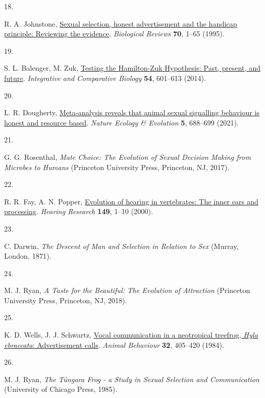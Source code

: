 \documentclass[
]{article}
\newlength{\cslhangindent}
\newlength{\csllabelwidth}
\newenvironment{CSLReferences}[2] %
 {\begin{list}{}{%
  \setlength{\itemindent}{0pt}
  \setlength{\leftmargin}{0pt}
  \setlength{\parsep}{0pt}
  \ifodd #1
   \setlength{\leftmargin}{\cslhangindent}
   \setlength{\itemindent}{-1\cslhangindent}
  \fi
  \setlength{\itemsep}{#2\baselineskip}}}
 {\end{list}}
\newcommand{\CSLLeftMargin}[1]{\parbox[t]{\csllabelwidth}{\strut#1\strut}}
\newcommand{\CSLRightInline}[1]{\parbox[t]{\linewidth - \csllabelwidth}{\strut#1\strut}}
\begin{document}
\begin{CSLReferences}{0}{0}
\CSLLeftMargin{18. }%
\CSLRightInline{R. A. Johnstone,
\href{https://doi.org/10.1111/j.1469-185X.1995.tb01439.x}{Sexual
selection, honest advertisement and the handicap principle: {Reviewing}
the evidence}. \emph{Biological Reviews} \textbf{70}, 1--65 (1995).}

\CSLLeftMargin{19. }%
\CSLRightInline{S. L. Balenger, M. Zuk,
\href{https://doi.org/10.1093/icb/icu059}{Testing the {Hamilton}-{Zuk}
{Hypothesis}: {Past}, present, and future}. \emph{Integrative and
Comparative Biology} \textbf{54}, 601--613 (2014).}

\CSLLeftMargin{20. }%
\CSLRightInline{L. R. Dougherty,
\href{https://doi.org/10.1038/s41559-021-01409-z}{Meta-analysis reveals
that animal sexual signalling behaviour is honest and resource based}.
\emph{Nature Ecology \& Evolution} \textbf{5}, 688--699 (2021).}

\CSLLeftMargin{21. }%
\CSLRightInline{G. G. Rosenthal, \emph{Mate Choice: The Evolution of
Sexual Decision Making from Microbes to Humans} (Princeton University
Press, Princeton, NJ, 2017).}

\CSLLeftMargin{22. }%
\CSLRightInline{R. R. Fay, A. N. Popper,
\href{https://doi.org/10.1016/S0378-5955(00)00168-4}{Evolution of
hearing in vertebrates: The inner ears and processing}. \emph{Hearing
Research} \textbf{149}, 1--10 (2000).}

\CSLLeftMargin{23. }%
\CSLRightInline{C. Darwin, \emph{The Descent of Man and Selection in
Relation to Sex} (Murray, London, 1871).}

\CSLLeftMargin{24. }%
\CSLRightInline{M. J. Ryan, \emph{A Taste for the Beautiful: {The}
Evolution of Attraction} (Princeton University Press, Princeton, NJ,
2018).}

\CSLLeftMargin{25. }%
\CSLRightInline{K. D. Wells, J. J. Schwartz,
\href{https://doi.org/10.1016/S0003-3472(84)80277-8}{Vocal communication
in a neotropical treefrog, \emph{{Hyla} ebraccata}: {Advertisement}
calls}. \emph{Animal Behaviour} \textbf{32}, 405--420 (1984).}

\CSLLeftMargin{26. }%
\CSLRightInline{M. J. Ryan, \emph{The Túngara Frog - a Study in Sexual
Selection and Communication} (University of Chicago Press, 1985).}


\end{CSLReferences}
\end{document}
